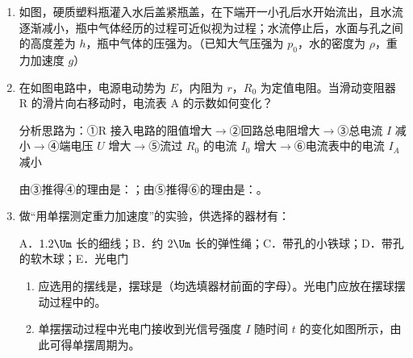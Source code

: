 \documentclass[\gkver]{gaokaozhenti}
\begin{document}
\begin{enumerate}
\item
如图，硬质塑料瓶灌入水后盖紧瓶盖，在下端开一小孔后水开始流出，且水流逐渐减小，瓶中气体经历的过程可近似视为过程；水流停止后，水面与孔之间的高度差为 $h$，瓶中气体的压强为。（已知大气压强为 $p_{0}$，水的密度为 $\rho$，重力加速度 $g$）
\onepicture[align=right, w=1.34cm]{}

\item
在如图电路中，电源电动势为 $E$，内阻为 $r$，$R_{0}$ 为定值电阻。当滑动变阻器 R 的滑片向右移动时，电流表 A 的示数如何变化？

分析思路为：①R 接入电路的阻值增大$\to$②回路总电阻增大$\to$③总电流 $I$ 减小$\to$④端电压 $U$ 增大$\to$⑤流过 $R_{0}$ 的电流 $I_{0}$ 增大$\to$⑥电流表中的电流 $I_{A}$ 减小

由③推得④的理由是：；由⑤推得⑥的理由是：。
\onepicture[align=right, w=3.46cm]{}

\item
做“用单摆测定重力加速度”的实验，供选择的器材有：

A．$1.2\Um$ 长的细线；B．约 $2\Um$ 长的弹性绳；C．带孔的小铁球；D．带孔的软木球；E．光电门
\begin{enumerate}
	\item
	应选用的摆线是，摆球是（均选填器材前面的字母）。光电门应放在摆球摆动过程中的。
	\item
	单摆摆动过程中光电门接收到光信号强度 $I$ 随时间 $t$ 的变化如图所示，由此可得单摆周期为。


\end{enumerate}
\end{enumerate}
\end{document}
